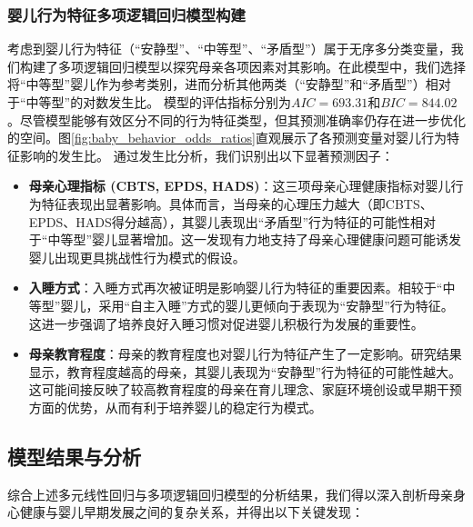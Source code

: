\documentclass[withoutpreface,bwprint]{cumcmthesis}
\begin{document}
\subsubsection{婴儿行为特征多项逻辑回归模型构建}
考虑到婴儿行为特征（“安静型”、“中等型”、“矛盾型”）属于无序多分类变量，我们构建了多项逻辑回归模型以探究母亲各项因素对其影响。在此模型中，我们选择将“中等型”婴儿作为参考类别，进而分析其他两类（“安静型”和“矛盾型”）相对于“中等型”的对数发生比。
模型的评估指标分别为$AIC = 693.31$和$BIC = 844.02$。尽管模型能够有效区分不同的行为特征类型，但其预测准确率仍存在进一步优化的空间。图\ref{fig:baby_behavior_odds_ratios}直观展示了各预测变量对婴儿行为特征影响的发生比。
通过发生比分析，我们识别出以下显著预测因子：
\begin{itemize}
    \item \textbf{母亲心理指标 (CBTS, EPDS, HADS)}：这三项母亲心理健康指标对婴儿行为特征表现出显著影响。具体而言，当母亲的心理压力越大（即CBTS、EPDS、HADS得分越高），其婴儿表现出“矛盾型”行为特征的可能性相对于“中等型”婴儿显著增加。这一发现有力地支持了母亲心理健康问题可能诱发婴儿出现更具挑战性行为模式的假设。
    \item \textbf{入睡方式}：入睡方式再次被证明是影响婴儿行为特征的重要因素。相较于“中等型”婴儿，采用“自主入睡”方式的婴儿更倾向于表现为“安静型”行为特征。这进一步强调了培养良好入睡习惯对促进婴儿积极行为发展的重要性。
    \item \textbf{母亲教育程度}：母亲的教育程度也对婴儿行为特征产生了一定影响。研究结果显示，教育程度越高的母亲，其婴儿表现为“安静型”行为特征的可能性越大。这可能间接反映了较高教育程度的母亲在育儿理念、家庭环境创设或早期干预方面的优势，从而有利于培养婴儿的稳定行为模式。
\end{itemize}

\subsection{模型结果与分析}
综合上述多元线性回归与多项逻辑回归模型的分析结果，我们得以深入剖析母亲身心健康与婴儿早期发展之间的复杂关系，并得出以下关键发现：
\end{document}
